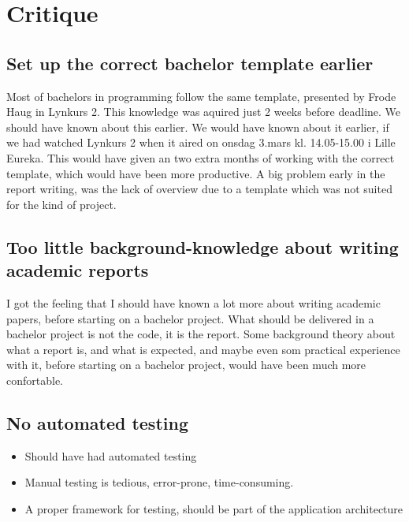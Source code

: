 \chapter{Critique}

\section{Set up the correct bachelor template earlier}

Most of bachelors in programming follow the same template, presented by Frode Haug in Lynkurs 2. This knowledge was aquired just 2 weeks before deadline. We should have known about this earlier. We would have known about it earlier, if we had watched Lynkurs 2 when it aired on onsdag 3.mars kl. 14.05-15.00 i Lille Eureka. This would have given an two extra months of working with the correct template, which would have been more productive. A big problem early in the report writing, was the lack of overview due to a template which was not suited for the kind of project.



\section{Too little background-knowledge about writing academic reports}

I got the feeling that I should have known a lot more about writing academic papers, before starting on a bachelor project. What should be delivered in a bachelor project is not the code, it is the report. Some background theory about what a report is, and what is expected, and maybe even som practical experience with it, before starting on a bachelor project, would have been much more confortable.



\section{No automated testing}

\begin{itemize}
    \item Should have had automated testing
    \item Manual testing is tedious, error-prone, time-consuming.
    \item A proper framework for testing, should be part of the application architecture
\end{itemize}